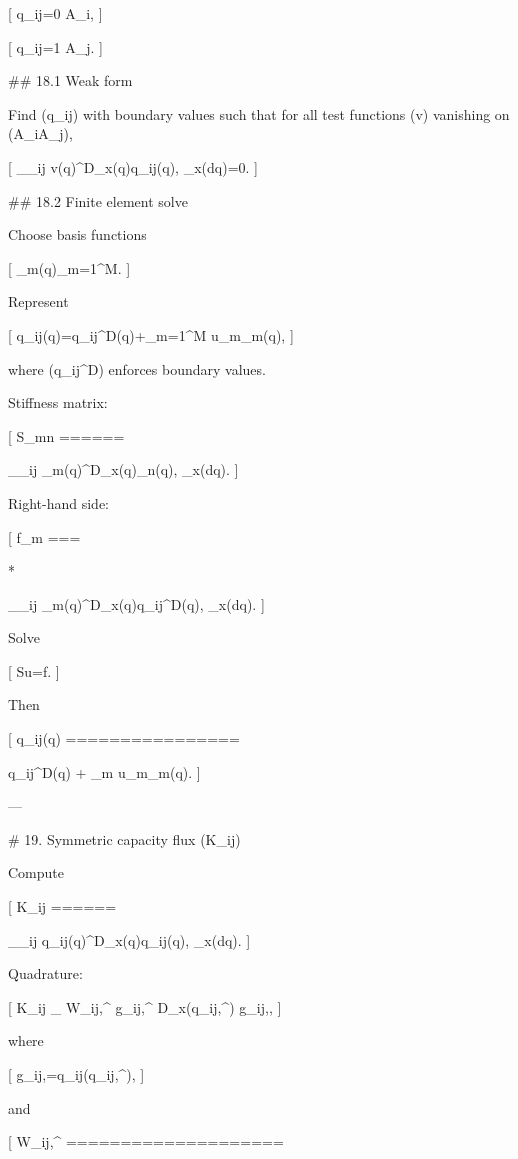 [
q_{ij}=0
\quad{}\partial A_i,
]

[
q_{ij}=1
\quad{}\partial A_j.
]

## 18.1 Weak form

Find (q_{ij}) with boundary values such that for all test functions (v) vanishing on (\partial A_i\cup\partial A_j),

[
\int_{\Omega_{ij}}
\nabla v(q)^\top D_x(q)\nabla q_{ij}(q),
\rho_x(\mathrm dq)=0.
]

## 18.2 Finite element solve

Choose basis functions

[
{\varphi_m(q)}_{m=1}^M.
]

Represent

[
q_{ij}(q)=q_{ij}^{\rm D}(q)+\sum_{m=1}^M u_m\varphi_m(q),
]

where (q_{ij}^{\rm D}) enforces boundary values.

Stiffness matrix:

[
S_{mn}
======

\int_{\Omega_{ij}}
\nabla\varphi_m(q)^\top D_x(q)\nabla\varphi_n(q),
\rho_x(\mathrm dq).
]

Right-hand side:

[
f_m
===

*

\int_{\Omega_{ij}}
\nabla\varphi_m(q)^\top D_x(q)\nabla q_{ij}^{\rm D}(q),
\rho_x(\mathrm dq).
]

Solve

[
Su=f.
]

Then

[
\nabla q_{ij}(q)
================

\nabla q_{ij}^{\rm D}(q)
+
\sum_m u_m\nabla\varphi_m(q).
]

---

# 19. Symmetric capacity flux (K_{ij})

Compute

[
K_{ij}
======

\int_{\Omega_{ij}}
\nabla q_{ij}(q)^\top D_x(q)\nabla q_{ij}(q),
\rho_x(\mathrm dq).
]

Quadrature:

[
K_{ij}
\approx
\sum_\ell
W_{ij,\ell}^{\Sigma}
g_{ij,\ell}^\top
D_x(q_{ij,\ell}^{\Sigma})
g_{ij,\ell},
]

where

[
g_{ij,\ell}=\nabla q_{ij}(q_{ij,\ell}^{\Sigma}),
]

and

[
W_{ij,\ell}^{\Sigma}
====================

